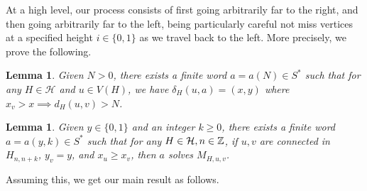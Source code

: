 \documentclass[a4paper]{article}
\newtheorem{lem}[result]{Lemma}
\theoremstyle{definition}
\begin{document}
At a  high level, our process consists of first going arbitrarily far to the right, and then going arbitrarily far to the left, being particularly careful not miss vertices at a specified height $i \in \{0,1\}$ as we travel back to the left. More precisely, we prove the following.
\begin{lem}\label{rough moving}
    Given $N> 0$, there exists a finite word $a = a(N) \in S^*$ such that for any $H \in \mathcal{H}$ and $u \in V(H)$, we have $\delta_H(u,a) = (x,y)$ where $x_v > x \implies d_H(u,v)> N$.
\end{lem}
\begin{lem}\label{fine moving}
    Given $y\in\{0,1\}$ and an integer $k \ge 0$, there exists a finite word $a= a(y,k) \in S^*$ such that for any $H \in \mathcal{H},n \in \Bbb{Z}$, if $u,v$ are connected in $H_{n,n+k}$, $y_v = y$, and $x_u\ge x_v$, then $a$ solves $M_{H,u,v}$. 
\end{lem}
Assuming this, we get our main result as follows. 
\end{document}
